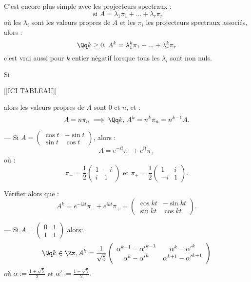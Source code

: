 \documentclass[class=report,crop=false]{standalone}
\begin{document}
C'est encore plus simple avec les projecteurs spectraux :
\[\mbox{ si } A = \lambda_1\pi_1 + ... + \lambda_r \pi_r\]
où les $\lambda_i$ sont les valeurs propres de $A$ et les $\pi_i$ les projecteurs spectraux associés, alors :
\[\Qq k \ge 0, \,A^k = \lambda_1^k \pi_1 + ... +\lambda_r^k\pi_r \]
c'est vrai aussi pour $k$ entier négatif lorsque tous les $\lambda_i$ sont non nuls.
\begin{exemple}
Si 

[[ICI TABLEAU]]


alors  les valeurs propres de $A$ sont $0$ et $n$, et :
\[A = n \pi_n \implies \Qq k,\,A^k = n^k \pi_n = n^{k-1}A .\] 
\end{exemple}

\begin{exercicecours}
--- Si $A= \left(\begin{array}{cc}
\cos t & -\sin t\\
\sin t & \cos t
\end{array}\right)$, alors : \[A = e^{-it}\pi_- + e^{it }\pi_+\]
où :
\[\pi_- = \frac{1}{2}\left(\begin{array}{cc}
1& -i\\
i & 1
\end{array}\right)\mbox{ et }\pi_+ = \frac{1}{2}\left(\begin{array}{cc}
1& i\\
-i & 1
\end{array}\right) .\]

Vérifier alors que :
\[A^k = e^{-ikt}\pi_- + e^{ikt} \pi_+ = \left(\begin{array}{cc}
\cos kt & -\sin kt\\
\sin kt & \cos kt
\end{array}\right).\]


--- Si $A = \left(\begin{array}{cc}
0& 1\\
1 & 1
\end{array}\right)$ alors: 
\[\Qq k \in \Zz, A^k = \frac{1}{\sqrt{5}}\left(\begin{array}{cc}
\alpha^{k-1} -{\alpha'}^{k-1} & \alpha^{k} -{\alpha'}^{k}\\
\alpha^{k} -{\alpha'}^{k}& \alpha^{k+1} -{\alpha'}^{k+1}
\end{array}\right)\]
où $\alpha := \frac{1+\sqrt{5}}{2}$ et $\alpha' := \frac{1-\sqrt{5}}{2}$.
\end{exercicecours}
\end{document}

